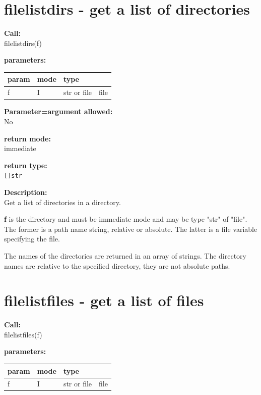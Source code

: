     \section{filelistdirs -  get a list of directories}\label{sec:iffilelistdirs}
        
        {\bf Call:} \\
        filelistdirs(f)
        
        {\bf parameters:} \\
        \begin{tabular}{| l | l | l | l |}
        \hline
        param  & mode & type & \\
        \hline \hline
        f & I & str or file & file \\ \hline
        \end{tabular}
        
        {\bf Parameter=argument allowed:} \\
        No
        
        {\bf return mode:} \\
        immediate

        {\bf return type:} \\
        \verb'[]str'
        
        {\bf Description:} \\
        Get a list of directories in a directory.
        
        {\bf f} is the directory and must be immediate mode and may be type "str"
        of "file". The former is a path name string, relative or absolute.
        The latter is a file variable specifying the file.
                
        The names of the directories are returned in an array of
        strings. The directory names are relative to the specified
        directory, they are not absolute paths.
 


    \section{filelistfiles -  get a list of files}\label{sec:iffilelistfiles}
        
        {\bf Call:} \\
        filelistfiles(f)
        
        {\bf parameters:} \\
        \begin{tabular}{| l | l | l | l |}
        \hline
        param  & mode & type & \\
        \hline \hline
        f & I & str or file & file \\ \hline
        \end{tabular}
        
